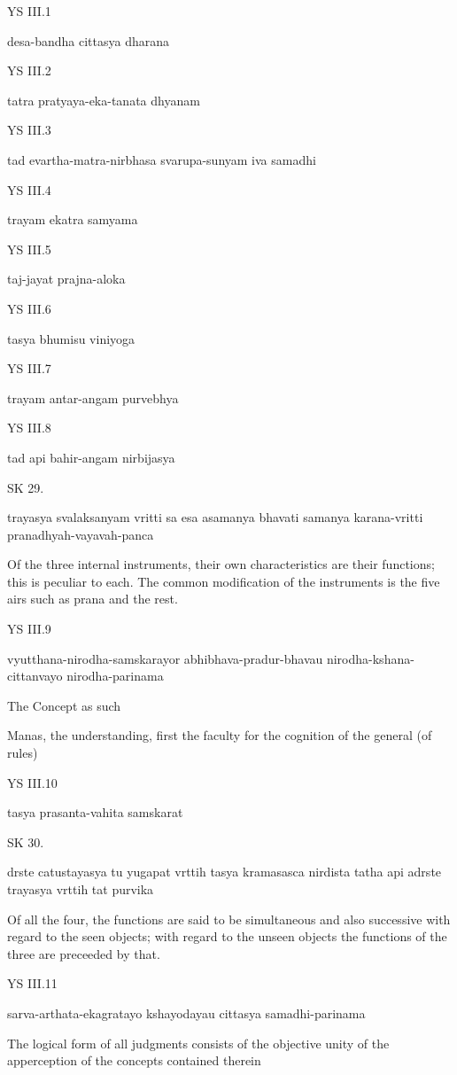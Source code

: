 
YS III.1

desa-bandha cittasya dharana

YS III.2

tatra pratyaya-eka-tanata dhyanam

YS III.3

tad evartha-matra-nirbhasa svarupa-sunyam iva samadhi

YS III.4

trayam ekatra samyama

YS III.5

taj-jayat prajna-aloka

YS III.6

tasya bhumisu viniyoga

YS III.7

trayam antar-angam purvebhya

YS III.8

tad api bahir-angam nirbijasya

SK 29.

trayasya svalaksanyam vritti sa esa asamanya bhavati
samanya karana-vritti pranadhyah-vayavah-panca

Of the three internal instruments, their own characteristics are their functions;
this is peculiar to each.
The common modification of the instruments is the five airs
such as prana and the rest.

YS III.9

vyutthana-nirodha-samskarayor abhibhava-pradur-bhavau nirodha-kshana-cittanvayo nirodha-parinama

The Concept as such

Manas, the understanding, first the faculty for the cognition of the general (of rules)

YS III.10

tasya prasanta-vahita samskarat

SK 30.

drste catustayasya tu yugapat vrttih tasya kramasasca nirdista
tatha api adrste trayasya vrttih tat purvika

Of all the four, the functions are said to be simultaneous and also successive
with regard to the seen objects;
with regard to the unseen objects
the functions of the three are preceeded by that.

YS III.11

sarva-arthata-ekagratayo kshayodayau cittasya samadhi-parinama

The logical form of all judgments consists of the objective unity of the apperception of the concepts contained therein

